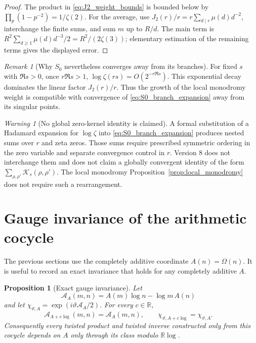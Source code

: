\documentclass[11pt]{amsart}
\numberwithin{equation}{section}
\theoremstyle{plain}
\newtheorem{proposition}[theorem]{Proposition}
\theoremstyle{definition}
\theoremstyle{remark}
\newtheorem{remark}[theorem]{Remark}
\newtheorem{warning}[theorem]{Warning}
\begin{document}
\begin{proof}
The product in \eqref{eq:J2_weight_bounds} is bounded below by
\(\prod_p(1-p^{-2})=1/\zeta(2)\).  For the average, use
\(J_2(r)/r=r\sum_{d\mid r}\mu(d)d^{-2}\), interchange the finite sums, and
sum \(m\) up to \(R/d\).  The main term is
\(R^2\sum_{d\ge1}\mu(d)d^{-3}/2=R^2/(2\zeta(3))\); elementary estimation of
the remaining terms gives the displayed error.
\end{proof}

\begin{remark}[Why \(S_0\) nevertheless converges away from its branches]
\label{rem:J2_decay_compensation}
For fixed \(s\) with \(\Re s>0\), once \(r\Re s>1\),
\(\log\zeta(rs)=O(2^{-r\Re s})\).  This exponential decay dominates the
linear factor \(J_2(r)/r\).  Thus the growth of the local monodromy weight
is compatible with convergence of \eqref{eq:S0_branch_expansion} away from
its singular points.
\end{remark}

\begin{warning}[No global zero-kernel identity is claimed]
\label{warn:no_global_zero_kernel}
A formal substitution of a Hadamard expansion for \(\log\zeta\) into
\eqref{eq:S0_branch_expansion} produces nested sums over \(r\) and zeta
zeros.  Those sums require prescribed symmetric ordering in the zero
variable and separate convergence control in \(r\).  Version 8 does not
interchange them and does not claim a globally convergent identity of the
form \(\sum_{\rho,\rho'}\mathcal K_s(\rho,\rho')\).  The local monodromy
Proposition~\ref{prop:local_monodromy} does not require such a rearrangement.
\end{warning}


\section{Gauge invariance of the arithmetic cocycle}
\label{sec:gauge_invariance}

The previous sections use the completely additive coordinate
\(A(n)=\Omega(n)\).  It is useful to record an exact invariance that holds for
any completely additive \(A\).

\begin{proposition}[Exact gauge invariance]
\label{prop:gauge_invariance}
Let
\begin{equation}
\mathcal A_A(m,n)=A(m)\log n-\log m\,A(n)
\label{eq:general_additive_area}
\end{equation}
and let \(\chi_{\vartheta,A}=\exp(i\vartheta\mathcal A_A/2)\).
For every \(c\in\mathbb R\),
\begin{equation}
\boxed{
\mathcal A_{A+c\log}(m,n)=\mathcal A_A(m,n),
\qquad
\chi_{\vartheta,A+c\log}=\chi_{\vartheta,A}.}
\label{eq:gauge_invariance}
\end{equation}
Consequently every twisted product and twisted inverse constructed only from
this cocycle depends on \(A\) only through its class modulo
\(\mathbb R\log\).
\end{proposition}
\end{document}
